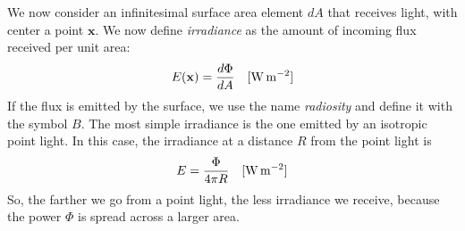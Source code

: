 We now consider an infinitesimal surface area element $dA$ that receives light, with center a point $\mathbf{x}$. We now define \emph{irradiance} as the amount of incoming flux received per unit area:
\begin{equation*}
E(\mathbf{x}) = \frac{d \Phi}{d A}  \ \ \ [\SI{}{\watt \per \square \metre}]
\end{equation*}
If the flux is emitted by the surface, we use the name \emph{radiosity} and define it with the symbol $B$.
The most simple irradiance is the one emitted by an isotropic point light. In this case, the irradiance at a distance $R$ from the point light is 
\begin{equation*}
E = \frac{\Phi}{4 \pi R} \ \ \ [\SI{}{\watt \per \square \metre}]
\end{equation*}
So, the farther we go from a point light, the less irradiance we receive, because the power $\Phi$ is spread across a larger area.

